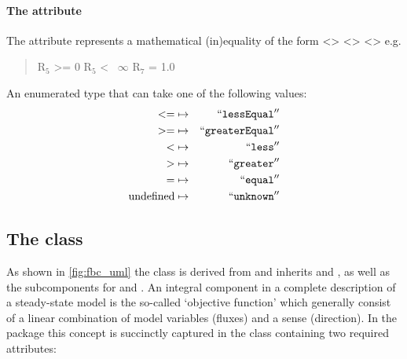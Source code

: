 \paragraph{The  attribute}
The  attribute represents a mathematical (in)equality of the form <> <> <> e.g.
 \begin{quote}\center
 R$_{5}$ >= 0\newline
 R$_{5}$ <~ $\infty$\newline
 R$_{7}$ = 1.0\newline
\end{quote}
An enumerated type that can take one of the following values:
\begin{eqnarray*}
\label{fb-operation-enum}
 \nonumber
  <= & \mapsto & ``\textcolor{black}{\textup{\ttfamily{lessEqual}}}''\\
  >= & \mapsto & ``\textcolor{black}{\textup{\ttfamily{greaterEqual}}}''\\
  < & \mapsto & ``\textcolor{black}{\textup{\ttfamily{less}}}''\\
  > & \mapsto & ``\textcolor{black}{\textup{\ttfamily{greater}}}''\\
  = & \mapsto & ``\textcolor{black}{\textup{\ttfamily{equal}}}''\\
  \textrm{undefined} & \mapsto & ``\textcolor{black}{\textup{\ttfamily{unknown}}}''
\end{eqnarray*}


\subsection{The \FBC {} class}
\label{objective-class}
\label{listoffluxobjectives-class}

As shown in \ref{fig:fbc_uml} the \FBC \Objective class is derived from \SBML \SBase and inherits  and , as well as the subcomponents for \Annotation and \Notes. An integral component in a complete description of a steady-state model is the so-called `objective function' which generally consist of a linear combination of model variables (fluxes) and a sense (direction). In the \FBC package this concept is succinctly captured in the \Objective class containing two required attributes:

